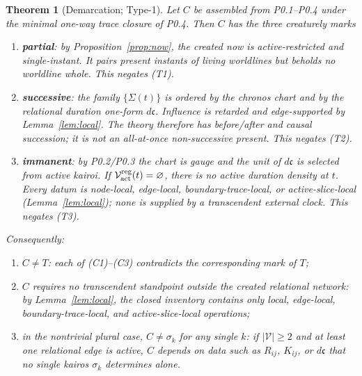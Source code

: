 \documentclass[11pt,a4paper]{article}
\theoremstyle{definition}
\theoremstyle{plain}
\newtheorem{theorem}[definition]{Theorem}
\theoremstyle{remark}
\begin{document}
\begin{theorem}[Demarcation; Type-1]\label{thm:demarc}
Let \(C\) be assembled from P0.1--P0.4 under the minimal one-way trace closure of P0.4.
Then \(C\) has the three creaturely marks
\begin{enumerate}[label=\textup{(C\arabic*)},leftmargin=1.25cm]
\item \textbf{partial}: by Proposition~\ref{prop:now}, the created now is
active-restricted and single-instant. It pairs present instants of living worldlines but
beholds no worldline whole. This negates (T1).

\item \textbf{successive}: the family \(\{\Sigma(t)\}\) is ordered by the chronos chart
and by the relational duration one-form \(d\mathfrak c\). Influence is retarded and
edge-supported by Lemma~\ref{lem:local}. The theory therefore has before/after and causal
succession; it is not an all-at-once non-successive present. This negates (T2).

\item \textbf{immanent}: by P0.2/P0.3 the chart is gauge and the unit of \(d\mathfrak c\)
is selected from active kairoi. If \(\mathcal V_{\rm act}^{\rm reg}(t)=\varnothing\), there
is no active duration density at \(t\). Every datum is node-local, edge-local,
boundary-trace-local, or active-slice-local (Lemma~\ref{lem:local}); none is supplied by
a transcendent external clock. This negates (T3).
\end{enumerate}
Consequently:
\begin{enumerate}[label=\textup{(\alph*)},leftmargin=1.2cm]
\item \(C\neq T\): each of (C1)--(C3) contradicts the corresponding mark of \(T\);
\item \(C\) requires no transcendent standpoint outside the created relational network:
by Lemma~\ref{lem:local}, the closed inventory contains only local, edge-local,
boundary-trace-local, and active-slice-local operations;
\item in the nontrivial plural case, \(C\neq\sigma_k\) for any single \(k\): if
\(|\mathcal V|\ge2\) and at least one relational edge is active, \(C\) depends on data
such as \(R_{ij}\), \(K_{ij}\), or \(d\mathfrak c\) that no single kairos \(\sigma_k\)
determines alone.
\end{enumerate}
\end{theorem}
\end{document}
